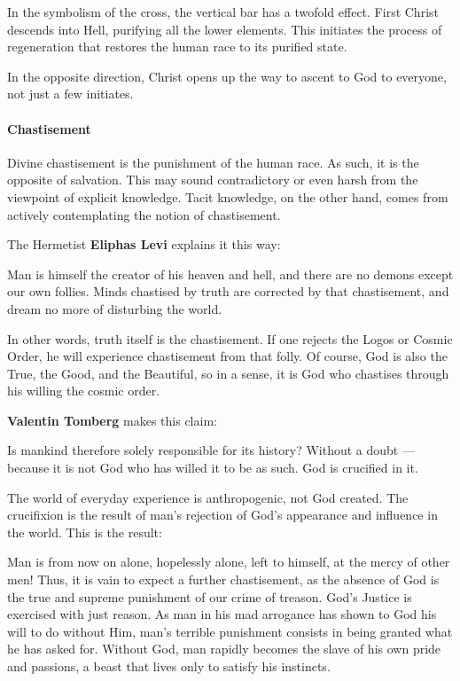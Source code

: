 In the symbolism of the cross, the vertical bar has a twofold effect. First Christ descends into Hell, purifying all the lower elements. This initiates the process of regeneration that restores the human race to its purified state.

In the opposite direction, Christ opens up the way to ascent to God to everyone, not just a few initiates.

\paragraph{Chastisement}
Divine chastisement is the punishment of the human race. As such, it is the opposite of salvation. This may sound contradictory or even harsh from the viewpoint of explicit knowledge. Tacit knowledge, on the other hand, comes from actively contemplating the notion of chastisement.

The Hermetist \textbf{Eliphas Levi} explains it this way:

\begin{quotex}
Man is himself the creator of his heaven and hell, and there are no demons except our own follies. Minds chastised by truth are corrected by that chastisement, and dream no more of disturbing the world. 

\end{quotex}
In other words, truth itself is the chastisement. If one rejects the Logos or Cosmic Order, he will experience chastisement from that folly. Of course, God is also the True, the Good, and the Beautiful, so in a sense, it is God who chastises through his willing the cosmic order.

\textbf{Valentin Tomberg} makes this claim:

\begin{quotex}
Is mankind therefore solely responsible for its history? Without a doubt — because it is not God who has willed it to be as such. God is crucified in it. 

\end{quotex}
The world of everyday experience is anthropogenic, not God created. The crucifixion is the result of man's rejection of God's appearance and influence in the world. This is the result:

\begin{quotex}
Man is from now on alone, hopelessly alone, left to himself, at the mercy of other men! Thus, it is vain to expect a further chastisement, as the absence of God is the true and supreme punishment of our crime of treason. God's Justice is exercised with just reason. As man in his mad arrogance has shown to God his will to do without Him, man's terrible punishment consists in being granted what he has asked for. Without God, man rapidly becomes the slave of his own pride and passions, a beast that lives only to satisfy his instincts. 

\end{quotex}
